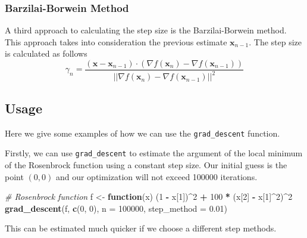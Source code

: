 \documentclass[12pt,]{article}
\newenvironment{Shaded}{\begin{snugshade}}{\end{snugshade}}
\newcommand{\CommentTok}[1]{\textcolor[rgb]{0.56,0.35,0.01}{\textit{#1}}}
\newcommand{\ControlFlowTok}[1]{\textcolor[rgb]{0.13,0.29,0.53}{\textbf{#1}}}
\newcommand{\DataTypeTok}[1]{\textcolor[rgb]{0.13,0.29,0.53}{#1}}
\newcommand{\DecValTok}[1]{\textcolor[rgb]{0.00,0.00,0.81}{#1}}
\newcommand{\FloatTok}[1]{\textcolor[rgb]{0.00,0.00,0.81}{#1}}
\newcommand{\KeywordTok}[1]{\textcolor[rgb]{0.13,0.29,0.53}{\textbf{#1}}}
\newcommand{\NormalTok}[1]{#1}
\newcommand{\OperatorTok}[1]{\textcolor[rgb]{0.81,0.36,0.00}{\textbf{#1}}}
\newcommand{\StringTok}[1]{\textcolor[rgb]{0.31,0.60,0.02}{#1}}
\begin{document}
\hypertarget{barzilai-borwein-method}{%
\subsubsection{Barzilai-Borwein Method}\label{barzilai-borwein-method}}

A third approach to calculating the step size is the Barzilai-Borwein
method. This approach takes into consideration the previous estimate
\(\mathbf{x}_{n-1}\). The step size is calculated as follows \[
    \gamma_n = \frac{(\mathbf{x} - \mathbf{x}_{n-1}) \cdot (\nabla f(\mathbf{x}_n) - \nabla f(\mathbf{x}_{n-1}))}{||\nabla f(\mathbf{x}_n) - \nabla f(\mathbf{x}_{n-1})||^2}
\]

\hypertarget{usage}{%
\subsection{Usage}\label{usage}}

Here we give some examples of how we can use the \texttt{grad\_descent}
function.

Firstly, we can use \texttt{grad\_descent} to estimate the argument of
the local minimum of the Rosenbrock function using a constant step size.
Our initial guess is the point \((0,0)\) and our optimization will not
exceed 100000 iterations.

\begin{Shaded}
\begin{Highlighting}[]
    \CommentTok{# Rosenbrock function}
\NormalTok{    f <-}\StringTok{ }\ControlFlowTok{function}\NormalTok{(x) (}\DecValTok{1} \OperatorTok{-}\StringTok{ }\NormalTok{x[}\DecValTok{1}\NormalTok{])}\OperatorTok{^}\DecValTok{2} \OperatorTok{+}\StringTok{ }\DecValTok{100} \OperatorTok{*}\StringTok{ }\NormalTok{(x[}\DecValTok{2}\NormalTok{] }\OperatorTok{-}\StringTok{ }\NormalTok{x[}\DecValTok{1}\NormalTok{]}\OperatorTok{^}\DecValTok{2}\NormalTok{)}\OperatorTok{^}\DecValTok{2}
    \KeywordTok{grad_descent}\NormalTok{(f, }\KeywordTok{c}\NormalTok{(}\DecValTok{0}\NormalTok{, }\DecValTok{0}\NormalTok{), }\DataTypeTok{n =} \DecValTok{100000}\NormalTok{, }\DataTypeTok{step_method =} \FloatTok{0.01}\NormalTok{)}
\end{Highlighting}
\end{Shaded}

This can be estimated much quicker if we choose a different step
methods.
\end{document}
